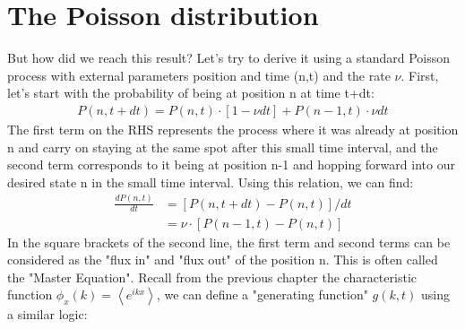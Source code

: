 \documentclass{report}
\begin{document}
\section{The Poisson distribution}
But how did we reach this result? Let's try to derive it using a standard Poisson process with external parameters position and time (n,t) and the rate $\nu$. First, let's start with the probability of being at position n at time t+dt:
\begin{align}
    P(n, t+d t)=P(n, t) \cdot[1-\nu d t]+P(n-1, t) \cdot \nu d t
\end{align}
The first term on the RHS represents the process where it was already at position n and carry on staying at the same spot after this small time interval, and the second term corresponds to it being at position n-1 and hopping forward into our desired state n in the small time interval. Using this relation, we can find:
\begin{align}
    \frac{d P(n, t)}{d t} & = \left[P(n,t+dt)-P(n,t)\right]/dt                                \\
                          & = \nu \cdot[P(n-1, t)-P(n, t)] \label{eq:master_equation_poisson}
\end{align}
In the square brackets of the second line, the first term and second terms can be considered as the "flux in" and "flux out" of the position n. This is often called the "Master Equation". Recall from the previous chapter the characteristic function $\phi_x(k)=\left\langle e^{i k x}\right\rangle$, we can define a "generating function" $g(k,t)$ using a similar logic:
\end{document}

